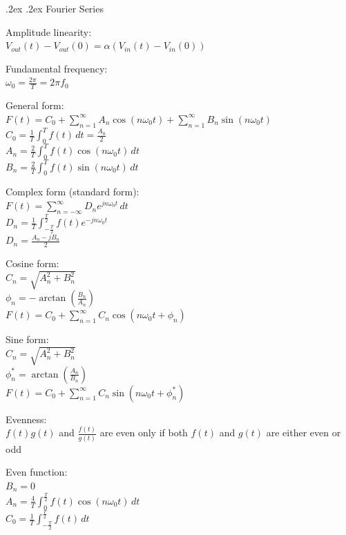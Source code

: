 \documentclass[10pt,landscape,a4paper]{article}
\makeatletter
\renewcommand{\section}{\@startsection{section}{1}{0mm}%
  {.2ex}%
  {.2ex}%
  {\color{myblue}\sffamily\small\bfseries}}
\makeatother
\begin{document}
\small
\begin{multicols*}{5}
  \raggedcolumns


  \section{Fourier Series}

  Amplitude linearity: \\
  \(V_{out} (t) - V_{out} (0) = \alpha (V_{in} (t) - V_{in} (0))\)

  Fundamental frequency: \\
  \(\omega_0 = \frac{2\pi}{T} = 2\pi f_0\)

  General form: \\
  \(F(t) = C_0 + \sum_{n = 1}^{\infty} A_n \cos (n \omega_0 t) + \sum_{n = 1}^{\infty} B_n \sin (n \omega_0 t)\) \\
  \(C_0 = \frac{1}{T} \int_0^T f(t) \, dt = \frac{A_0}{2}\) \\
  \(A_n = \frac{2}{T} \int_0^T f(t) \cos(n \omega_0 t) \, dt\) \\
  \(B_n = \frac{2}{T} \int_0^T f(t) \sin(n \omega_0 t) \, dt\)

  Complex form (standard form): \\
  \(F(t) = \sum_{n = - \infty}^{\infty} D_n e^{jn \omega_0 t} \, dt\) \\
  \(D_n = \frac{1}{T} \int_{- \frac{T}{2}}^{\frac{T}{2}} f(t) e^{-jn \omega_0 t}\) \\
  \(D_n = \frac{A_n - j B_n}{2}\)

  Cosine form: \\
  \(C_n = \sqrt{A_n^2 + B_n^2}\) \\
  \(\phi_n = - \arctan \left(\frac{B_n}{A_n} \right)\) \\
  \(F(t) = C_0 + \sum_{n = 1}^{\infty} C_n \cos(n \omega_0 t + \phi_n)\)

  Sine form: \\
  \(C_n = \sqrt{A_n^2 + B_n^2}\) \\
  \(\phi_n^* = \arctan \left(\frac{A_n}{B_n} \right)\) \\
  \(F(t) = C_0 + \sum_{n = 1}^{\infty} C_n \sin(n \omega_0 t + \phi_n^*)\)

  Evenness: \\
  \(f(t) g(t)\) and \(\frac{f(t)}{g(t)}\) are even only if both \(f(t)\) and \(g(t)\) are either even or odd

  Even function: \\
  \(B_n = 0\) \\
  \(A_n = \frac{4}{T} \int_0^{\frac{T}{2}} f(t) \cos(n \omega_0 t) \, dt\) \\
  \(C_0 = \frac{1}{T} \int_{-\frac{T}{2}}^{\frac{T}{2}} f(t) \, dt\)


\end{multicols*}
\end{document}
